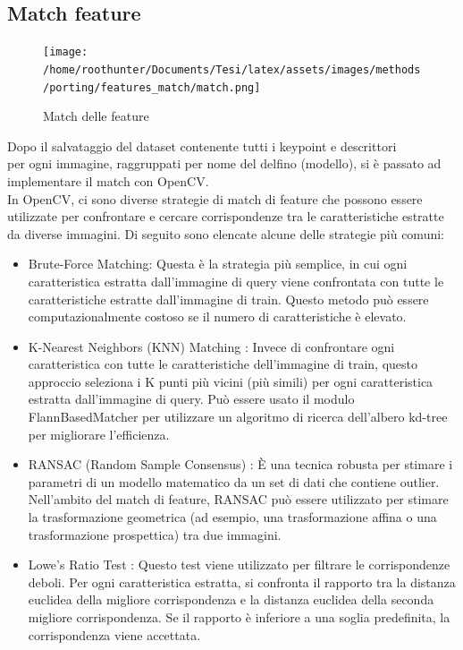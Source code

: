 \documentclass[a4paper,12pt]{report}
\begin{document}
      \subsection{Match feature}
      \begin{figure}[H]
        \centering
        \centering
        \texttt{[image: /home/roothunter/Documents/Tesi/latex/assets/images/methods/porting/features\_match/match.png]}   
        \caption{Match delle feature}
      \end{figure}


      Dopo il salvataggio del dataset contenente tutti i keypoint e descrittori 
      \\ per ogni immagine, raggruppati per nome del delfino (modello), si è passato ad implementare il match con OpenCV. \\
      In OpenCV, ci sono diverse strategie di match di feature che possono essere utilizzate per confrontare e cercare corrispondenze tra le caratteristiche estratte da diverse immagini. Di seguito sono elencate alcune delle strategie più comuni:

      \begin{itemize}
        \item Brute-Force Matching: Questa è la strategia più semplice, in cui ogni caratteristica estratta dall'immagine di query viene confrontata con tutte le caratteristiche estratte dall'immagine di train. Questo metodo può essere computazionalmente costoso se il numero di caratteristiche è elevato.
        \newpage
        \item K-Nearest Neighbors (KNN) Matching \cite{knn}: Invece di confrontare ogni caratteristica con tutte le caratteristiche dell'immagine di train, questo approccio seleziona i K punti più vicini (più simili) per ogni caratteristica estratta dall'immagine di query. Può essere usato il modulo FlannBasedMatcher per utilizzare un algoritmo di ricerca dell'albero kd-tree per migliorare l'efficienza.
        \item RANSAC (Random Sample Consensus) \cite{ransac}: È una tecnica robusta per stimare i parametri di un modello matematico da un set di dati che contiene outlier. Nell'ambito del match di feature, RANSAC può essere utilizzato per stimare la trasformazione geometrica (ad esempio, una trasformazione affina o una trasformazione prospettica) tra due immagini.
        \item Lowe's Ratio Test \cite{lowe2004distinctive}: Questo test viene utilizzato per filtrare le corrispondenze deboli. Per ogni caratteristica estratta, si confronta il rapporto tra la distanza euclidea della migliore corrispondenza e la distanza euclidea della seconda migliore corrispondenza. Se il rapporto è inferiore a una soglia predefinita, la corrispondenza viene accettata.
      \end{itemize}
\end{document}
